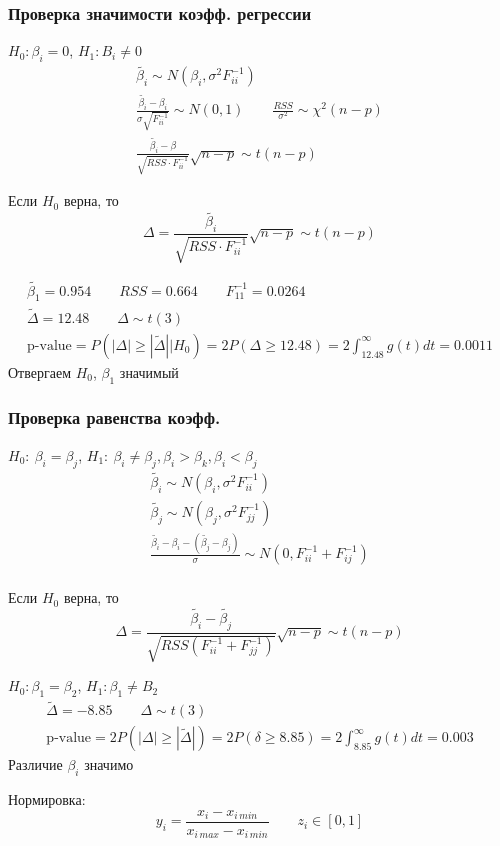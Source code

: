 \documentclass{article}
\begin{document}
\subsubsection{Проверка значимости коэфф. регрессии}
$H_0: \beta_i=0$, $H_1: B_i \neq 0$ 
\begin{gather*}
  \tilde{\beta_i}\sim N(\beta_i, \sigma^{2}F_{ii}^{-1}) \\ 
  \frac{\tilde{\beta_i}-\beta_i}{\sigma\sqrt{F_{ii}^{-1}}} \sim N(0,1) \qquad \frac{RSS}{\sigma^{2}}\sim \chi^{2}(n-p) \\ 
\frac{\tilde{\beta_i}-\beta}{\sqrt{RSS \cdot F_{ii}^{-1}}}\sqrt{n-p}\sim t(n-p)
\end{gather*}
\begin{theorem}
  Если $H_0$ верна, то 
  \[
  \Delta = \frac{\tilde{\beta_i}}{\sqrt{RSS \cdot F_{ii}^{-1}}}\sqrt{n-p} \sim t(n-p)
  \]
\end{theorem}
\begin{eg}
  \begin{gather*}
    \tilde{\beta_1}=0.954 \qquad RSS=0.664 \qquad F_{11}^{-1}=0.0264 \\ 
    \tilde{\Delta}=12.48 \qquad \Delta \sim t(3) \\ 
    \text{p-value} = P(|\Delta| \ge |\tilde{\Delta}| \big| H_0)=
    2P(\Delta \ge 12.48) = 2 \int_{12.48}^{\infty}g(t)dt = 0.0 011
  \end{gather*}
  Отвергаем $H_0$, $\beta_1$ значимый
\end{eg}
\subsubsection{Проверка равенства коэфф.}
$H_0: \: \beta_i =\beta_j$, $H_1:\: \beta_i\neq\beta_j, \beta_i > \beta_k, \beta_i < \beta_j$
\begin{gather*}
  \tilde{\beta_i}\sim N(\beta_i, \sigma^{2}F_{ii}^{-1}) \\ 
  \tilde{\beta_j}\sim N(\beta_j, \sigma^{2}F_{jj}^{-1}) \\ 
  \frac{\tilde{\beta_i}-\beta_i - (\tilde{\beta_j}-\beta_j)}{\sigma}\sim N(0, F^{-1}_{ii}+F^{-1}_{ij}) \\ 
\end{gather*}
\begin{theorem}
  Если $H_0$ верна, то
  \[
    \Delta = \frac{\tilde{\beta_i}-\tilde{\beta_j}}{\sqrt{RSS(F^{-1}_{ii}+F^{-1}_{jj})}}\sqrt{n-p} \sim t(n-p)
  \]
\end{theorem}
\begin{eg}
  $H_0:\beta_1=\beta_2$, $H_1:\beta_1\neq B_2$
  \begin{gather*}
    \tilde{\Delta}=-8.85 \qquad \Delta \sim t(3) \\ 
    \text{p-value}=2P(|\Delta| \ge |\tilde{\Delta}|)=2P(\delta \ge 8.85)
    = 2 \int_{8.85}^{\infty}g(t)dt=0.0 03
  \end{gather*}
  Различие $\beta_i$ значимо
\end{eg}
\begin{remark}
  Нормировка:\[
    y_i = \frac{x_i-x_{i\, min}}{x_{i \, max}-x_{i \, min}} \qquad z_i \in [0,1]
  \]
\end{remark}
\end{document}

